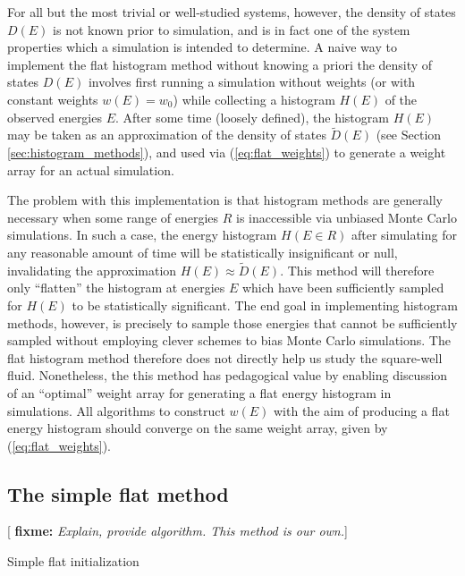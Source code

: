 \documentclass[11pt]{article}
\newcommand{\p}[1]{\left(#1\right)} %
\newcommand{\red}[1]{{\bf \color{red} #1}}
\newcommand{\fixme}[1]{[\red{fixme:} \emph{#1}]}
\begin{document}
For all but the most trivial or well-studied systems, however, the
density of states $D\p{E}$ is not known prior to simulation, and is in
fact one of the system properties which a simulation is intended to
determine. A naive way to implement the flat histogram method without
knowing a priori the density of states $D\p{E}$ involves first running
a simulation without weights (or with constant weights $w\p{E}=w_0$)
while collecting a histogram $H\p{E}$ of the observed energies
$E$. After some time (loosely defined), the histogram $H\p{E}$ may be
taken as an approximation of the density of states $\tilde D\p{E}$
(see Section \ref{sec:histogram_methods}), and used via
(\ref{eq:flat_weights}) to generate a weight array for an actual
simulation.

The problem with this implementation is that histogram methods are
generally necessary when some range of energies $R$ is inaccessible
via unbiased Monte Carlo simulations. In such a case, the energy
histogram $H\p{E\in R}$ after simulating for any reasonable amount of
time will be statistically insignificant or null, invalidating the
approximation $H\p{E}\approx\tilde D\p{E}$. This method will therefore
only ``flatten'' the histogram at energies $E$ which have been
sufficiently sampled for $H\p{E}$ to be statistically significant. The
end goal in implementing histogram methods, however, is precisely to
sample those energies that cannot be sufficiently sampled without
employing clever schemes to bias Monte Carlo simulations. The flat
histogram method therefore does not directly help us study the
square-well fluid. Nonetheless, the this method has pedagogical value
by enabling discussion of an ``optimal'' weight array for generating a
flat energy histogram in simulations. All algorithms to construct
$w\p{E}$ with the aim of producing a flat energy histogram should
converge on the same weight array, given by (\ref{eq:flat_weights}).

\subsection{The simple flat method}
\label{sec:simple_flat}



\fixme{Explain, provide algorithm. This method is our own.}

\begin{algorithm}[H]
  \caption{Simple flat initialization}
  \label{alg:simple_flat}
\end{algorithm}
\end{document}
